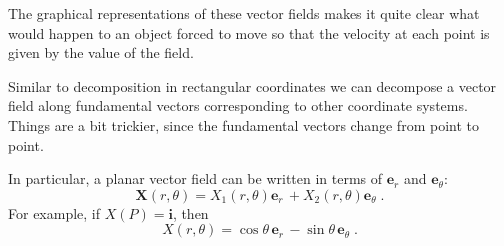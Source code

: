 \begin{frame}
The graphical representations of these vector fields makes
it quite clear what would happen to an object forced to move
so that the velocity at each point is given by the value of
the field.

Similar to decomposition in rectangular coordinates
we can decompose a vector field along fundamental vectors
corresponding to other coordinate systems. Things are a bit
trickier, since the fundamental vectors change from
point to point.

In particular, a planar vector field can be written in terms of
$\textbf{e}_r$ and $\textbf{e}_\theta$:
%
$$\textbf{X}(r,\theta) = X_1(r,\theta) \textbf{e}_r\, +
X_2(r,\theta) \textbf{e}_\theta\; .$$
%
For example, if $X(P) = \textbf{i}$, then
%
$$X(r,\theta) = \cos\theta \,\textbf{e}_r\,
-\sin\theta \, \textbf{e}_\theta\; .$$
\end{frame}